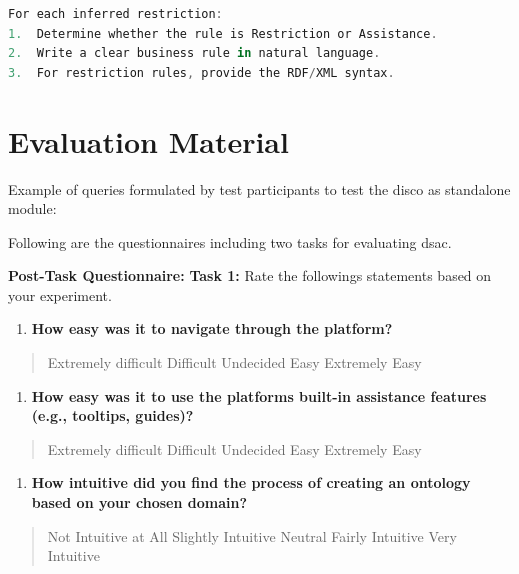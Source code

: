 \begin{appendix}
\begin{lstlisting}[language=JavaScript, captionpos=t, caption=Prompt Template for Axioms Extraction]
For each inferred restriction:
1.	Determine whether the rule is Restriction or Assistance.
2.	Write a clear business rule in natural language.
3.	For restriction rules, provide the RDF/XML syntax.


\end{lstlisting}

\chapter{Evaluation Material}

Example of queries formulated by test participants to test the \gls{disco} as
standalone module:

Following are the questionnaires including two tasks for evaluating
\gls{dsac}.

\textbf{Post-Task Questionnaire:}
\textbf{Task 1:} Rate the followings statements based on your
experiment.

\begin{enumerate}
\def\labelenumi{\arabic{enumi}.}
\item
  \textbf{How easy was it to navigate through the platform?}
\end{enumerate}

\begin{quote}
\textsquare Extremely difficult \textsquare Difficult \textsquare  Undecided \textsquare Easy \textsquare  Extremely Easy
\end{quote}

\begin{enumerate}
\def\labelenumi{\arabic{enumi}.}
\setcounter{enumi}{1}
\item
  \textbf{How easy was it to use the platform\textquotesingle s built-in
  assistance features (e.g., tooltips, guides)?}
\end{enumerate}

\begin{quote}
\textsquare Extremely difficult \textsquare  Difficult \textsquare  Undecided \textsquare  Easy \textsquare Extremely Easy
\end{quote}

\begin{enumerate}
\def\labelenumi{\arabic{enumi}.}
\setcounter{enumi}{2}
\item
  \textbf{How intuitive did you find the process of creating an ontology
  based on your chosen domain?}
\end{enumerate}

\begin{quote}
\textsquare Not Intuitive at All \textsquare Slightly Intuitive \textsquare  Neutral \textsquare  Fairly Intuitive
\textsquare Very Intuitive
\end{quote}


\end{appendix}
